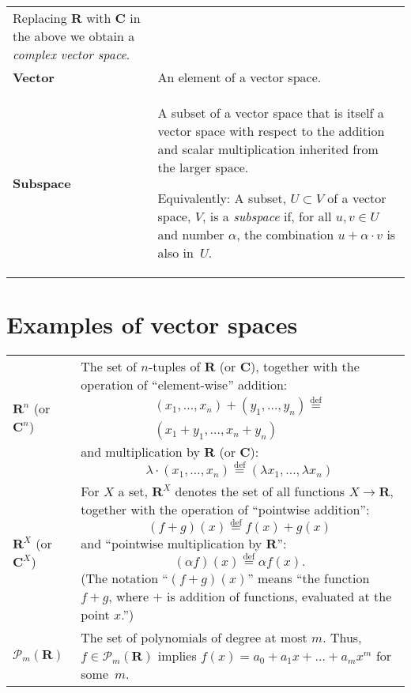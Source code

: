 \documentclass[10pt, a4paper, landscape]{article}
\newcommand{\defn}[1]{\textbf{#1}}
\newcommand{\isdef}{\stackrel{\text{def}}{=}}
\newcommand{\set}[1]{\mathbold{#1}}
\begin{document}
\begin{multicols*}{3}
\begin{tabularx}{\columnwidth}{@{}l>{\raggedright\arraybackslash}X@{}}
  Replacing $\set{R}$ with $\set{C}$ in the above we obtain a
  \emph{complex vector space}. \\

  \defn{Vector} & An element of a vector space. \\

  \defn{Subspace} & A subset of a vector space that is itself a vector
  space with respect to the addition and scalar multiplication inherited
  from the larger space.

  Equivalently: A subset, $U \subset V$ of a vector space, $V$, is a \emph{subspace} if, for all $u, v\in U$ and number $\alpha$, the combination $u+\alpha \cdot v$ is also in~$U$.
\end{tabularx}

\section*{Examples of vector spaces}
\begin{tabularx}{\columnwidth}{@{}l>{\raggedright\arraybackslash}X@{}}
  \toprule
  $\set{R}^n$ (or $\set{C}^n$) & The set of $n$-tuples of $\set{R}$ (or $\set{C}$), together with the operation of “element-wise” addition:
  \begin{multline*}
    (x_1, \dotsc, x_n) + (y_1, \dotsc, y_n) \isdef \\ (x_1+y_1, \dotsc, x_n+y_n) 
  \end{multline*}
  and multiplication by $\set{R}$ (or $\set{C}$):
  \begin{equation*}
    \lambda \cdot (x_1, \dotsc, x_n) \isdef (\lambda x_1, \dotsc, \lambda x_n) 
  \end{equation*} \\
  
  $\set{R}^X$ (or $\set{C}^X$) & For $X$ a set, $\set{R}^X$ denotes the set of all functions $X\to\mathbold{R}$, together with the operation of “pointwise addition”:
  \begin{equation*}
    (f+g)(x) \isdef f(x) + g(x)
  \end{equation*}
  and “pointwise multiplication by $\mathbold{R}$”:
  \begin{equation*}
    (\alpha f)(x) \isdef \alpha f(x).
  \end{equation*}
  (The notation “$(f+g)(x)$” means “the function $f+g$, where $+$ is addition of functions, evaluated at the point $x$.”) \\

  $\mathcal{P}_m(\set{R})$ & The set of polynomials of degree at most $m$. Thus, $f\in\mathcal{P}_m(\set{R})$ implies $f(x) = a_0 + a_1x + \dots + a_m x^m$ for some~$m$. \\


\end{tabularx}
\end{multicols*}
\end{document}
